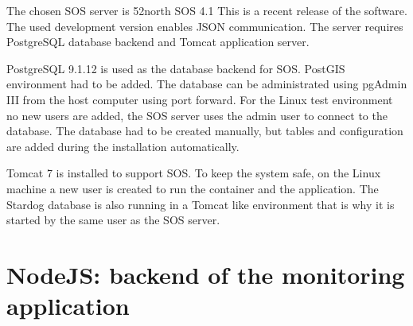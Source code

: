 The chosen SOS server is 52north SOS 4.1 This is a recent release of the software. The used development version enables JSON communication. The server requires PostgreSQL database backend and Tomcat application server.

PostgreSQL 9.1.12 is used as the database backend for SOS. PostGIS environment had to be added. The database can be administrated using pgAdmin III from the host computer using port forward. For the Linux test environment no new users are added, the SOS server uses the admin user to connect to the database. The database had to be created manually, but tables and configuration are added during the installation automatically.

Tomcat 7 is installed to support SOS. To keep the system safe, on the Linux machine a new user is created to run the container and the application. The Stardog database is also running in a Tomcat like environment that is why it is started by the same user as the SOS server. 

\section{NodeJS: backend of the monitoring application}

